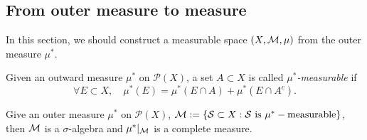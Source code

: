\subsection{From outer measure to measure}
In this section, 
we should construct a measurable space 
$(X,\mathcal{M},\mu)$ from the outer measure $\mu^{*}$. 
\begin{defn}
    \label{Defn:MuStarMeasurable}
    Given an outward measure $\mu^{*}$ on $\mathcal{P}(X)$, 
    a set $A\subset X$ is called \textit{$\mu^{*}$-measurable} 
    if 
    \begin{equation}
        \label{Equ:MeasurableCondition}
        \forall E\subset X,\quad \mu^{*}(E)=\mu^{*}(E\cap A)
        +\mu^{*}(E\cap A^c).
    \end{equation}
\end{defn}
\begin{thm}[Caratheodory]
    \label{Thm:CaratheodoryThm}
    Give an outer measure $\mu^{*}$ on $\mathcal{P}(X)$, 
    $\mathcal{M}:=\{\mathcal{S}\subset X:\mathcal{S}\text{ is }\mu^*-\text{measurable}\}$, 
    then $\mathcal{M}$ is a $\sigma$-algebra and 
    $\mu^{*}|_{\mathcal{M}}$ is a complete measure. 
\end{thm}
